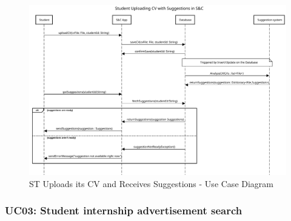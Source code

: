 \begin{figure}[H]
    \centering
    \includegraphics[width=1.0\textwidth]{Images/UC_2.pdf}
    \caption{ST Uploads its CV and Receives Suggestions - Use Case Diagram}
    \label{fig:use-case-diagram-2}
\end{figure}


\subsubsection{UC03: Student internship advertisement search}
\label{subsubsec:student-internship-advertisement-search}

